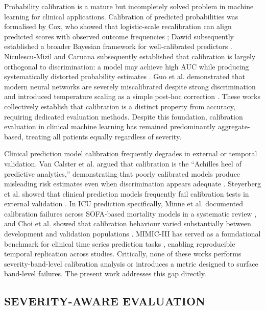 \documentclass{ieeeaccess}
\begin{document}
Probability calibration is a mature but incompletely solved problem in machine learning for clinical applications. Calibration of predicted probabilities was formalised by Cox, who showed that logistic-scale recalibration can align predicted scores with observed outcome frequencies \cite{b36}; Dawid subsequently established a broader Bayesian framework for well-calibrated predictors \cite{b1}. Niculescu-Mizil and Caruana subsequently established that calibration is largely orthogonal to discrimination: a model may achieve high AUC while producing systematically distorted probability estimates \cite{b2}. Guo et al. demonstrated that modern neural networks are severely miscalibrated despite strong discrimination and introduced temperature scaling as a simple post-hoc correction \cite{b4}. These works collectively establish that calibration is a distinct property from accuracy, requiring dedicated evaluation methods. Despite this foundation, calibration evaluation in clinical machine learning has remained predominantly aggregate-based, treating all patients equally regardless of severity.

Clinical prediction model calibration frequently degrades in external or temporal validation. Van Calster et al. argued that calibration is the ``Achilles heel of predictive analytics,'' demonstrating that poorly calibrated models produce misleading risk estimates even when discrimination appears adequate \cite{b11}. Steyerberg et al. showed that clinical prediction models frequently fail calibration tests in external validation \cite{b12}. In ICU prediction specifically, Minne et al. documented calibration failures across SOFA-based mortality models in a systematic review \cite{b23}, and Choi et al. showed that calibration behaviour varied substantially between development and validation populations \cite{b32}. MIMIC-III has served as a foundational benchmark for clinical time series prediction tasks \cite{b26}, enabling reproducible temporal replication across studies. Critically, none of these works performs severity-band-level calibration analysis or introduces a metric designed to surface band-level failures. The present work addresses this gap directly.

\subsection{SEVERITY-AWARE EVALUATION}
\end{document}
